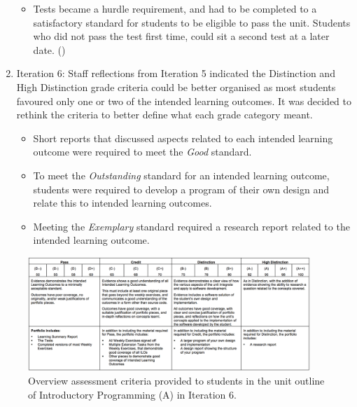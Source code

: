 \begin{enumerate}
\begin{itemize}[noitemsep,nolistsep]
    \item Tests became a hurdle requirement, and had to be completed to a satisfactory standard for students to be eligible to pass the unit. Students who did not pass the test first time, could sit a second test at a later date. ()
  \end{itemize}
  \item Iteration 6: Staff reflections from Iteration 5 indicated the Distinction and High Distinction grade criteria could be better organised as most students favoured only one or two of the intended learning outcomes. It was decided to rethink the criteria to better define what each grade category meant.
  \begin{itemize}[noitemsep,nolistsep]
  	\item Short reports that discussed aspects related to each intended learning outcome were required to meet the \emph{Good} standard.
    \item To meet the \emph{Outstanding} standard for an intended learning outcome, students were required to develop a program of their own design and relate this to intended learning outcomes.
    \item Meeting the \emph{Exemplary} standard required a research report related to the intended learning outcome. 
  \end{itemize}
\end{enumerate}

\begin{figure}[p]
	\centering
	\includegraphics[width=0.95\textwidth]{AssessmentCriteria}
	\caption{Overview assessment criteria provided to students in the unit outline of Introductory Programming (A) in Iteration 6.}
	\label{fig:i6_assessment_criteria}
\end{figure}

